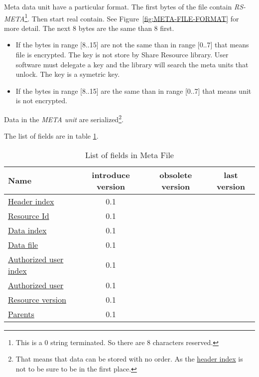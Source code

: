 Meta data unit have a particular format.
The first bytes of the file contain \emph{RS-META}\footnote{This is a 0 string terminated. So there are 8 characters reserved.}.
Then start real contain.
See Figure~\ref{fig:META-FILE-FORMAT} for more detail.
The next 8 bytes are the same than 8 first.
\begin{itemize}
 \item If the bytes in range [8..15] are not the same than in range [0..7] that means file is encrypted.
The key is not store by Share Resource library.
User software must delegate a key and the library will search the meta units that unlock.
The key is a symetric key.
 \item If the bytes in range [8..15] are the same than in range [0..7] that means unit is not encrypted.
\end{itemize}


Data in the \emph{META unit} are serialized\footnote{That means that data can be stored with no order. As the \hyperlink{fields:header-index}{header index} is not to be sure to be in the first place.}.



The list of fields are in table \ref{tab:field-list}.

\begin{table}[htbp]
  \begin{tabular}{l|c|c|c}
    Name & introduce version & obsolete version & last version \\
    \hline
    \hyperlink{fields:header-index}{Header index} & 0.1 & & \\
    \hyperlink{fields:resource-id}{Resource Id} & 0.1 & & \\
    \hyperlink{fields:data-index}{Data index} & 0.1 & & \\
    \hyperlink{fields:data-file}{Data file} & 0.1 & & \\
    \hyperlink{fields:auth-user-index}{Authorized user index} & 0.1 & & \\
    \hyperlink{fields:auth-user}{Authorized user} & 0.1 & & \\
    \hyperlink{fields:version}{Resource version} & 0.1 & & \\
    \hyperlink{fields:parents}{Parents} & 0.1 & & \\
  \end{tabular}
  \caption{List of fields in Meta File}
  \label{tab:field-list}
\end{table}

